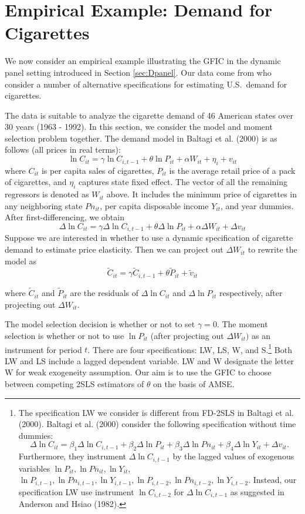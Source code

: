 \section{Empirical Example: Demand for Cigarettes}
\label{sec:cigarettes}
We now consider an empirical example illustrating the GFIC in the dynamic panel setting introduced in Section \ref{sec:Dpanel}.
Our data come from \cite{BaltagiEtAl2000} who consider a number of alternative specifications for estimating U.S.\ demand for cigarettes. 

The data is suitable to analyze the cigarette demand of 46 American states over 30 years (1963 - 1992). In this section, we consider the model and moment selection problem together. The demand model in Baltagi et al. (2000) is as follows (all prices in real terms): 
\[
\ln C_{it} =  \gamma \ln C_{i,t-1} + \theta \ln P_{it} + \alpha W_{it} + \eta_i +  v_{it}
\] 
where $C_{it}$ is per capita sales of cigarettes, $P_{it}$ is the average retail price of a pack of cigarettes, and $\eta_i$ captures state fixed effect. The vector of all the remaining regressors is denoted as $W_{it}$ above. It includes the minimum price of cigarettes in any neighboring state $Pn_{it}$, per capita disposable income $Y_{it}$, and year dummies. After first-differencing, we obtain 
\[
\Delta \ln C_{it} = \gamma \Delta \ln C_{i,t-1} +  \theta \Delta \ln P_{it} +\alpha \Delta W_{it} +  \Delta v_{it}
\]
 Suppose we are interested in whether to use a dynamic specification of cigarette demand to estimate price elasticity. Then we can project out $\Delta W_{it}$ to rewrite the model as
\[
\widetilde{C}_{it} = \gamma \widetilde{C}_{i,t-1} + \theta \widetilde{P}_{it} + \widetilde{v}_{it} 
\] 
 
 where $\widetilde{C}_{it}$ and $\widetilde{P}_{it}$ are the residuals of $\Delta \ln C_{it}$ and $\Delta \ln P_{it}$ respectively, after projecting out $\Delta W_{it}$.
 
The model selection decision is whether or not to set $\gamma = 0$. The moment selection is whether or not to use $\ln P_{it}$ (after projecting out $\Delta W_{it})$ as an instrument for period $t$.  There are four specifications:  LW, LS, W, and S.\footnote{The specification LW we consider is different from FD-2SLS in Baltagi et al. (2000). Baltagi et al. (2000) consider the following specification without time dummies:
 \[
\Delta \ln C_{it} = \beta_1 \Delta \ln C_{i,t-1} +  \beta_2 \Delta \ln P_{it} +\beta_3 \Delta \ln Pn_{it} +  \beta_4 \Delta \ln Y_{it} + \Delta v_{it}.
\]
Furthermore, they instrument $\Delta \ln C_{i,t-1}$ by the lagged values of exogenous variables $\ln P_{it}, \ln Pn_{it}, \ln Y_{it},$ $\ln P_{i,t-1}, \ln Pn_{i,t-1}, \ln Y_{i,t-1}, \ln P_{i,t-2}, \ln Pn_{i,t-2}, \ln Y_{i,t-2}$. Instead, our specification LW use instrument $\ln C_{i, t-2}$ for $\Delta \ln C_{i,t-1}$ as suggested in Anderson and Hsiao (1982).}
 Both LW and LS include a lagged dependent variable. LW and W designate the letter W for weak exogeneity assumption. Our aim is to use the GFIC to choose between competing 2SLS estimators of $\theta$ on the basis of AMSE. %
\newpage


